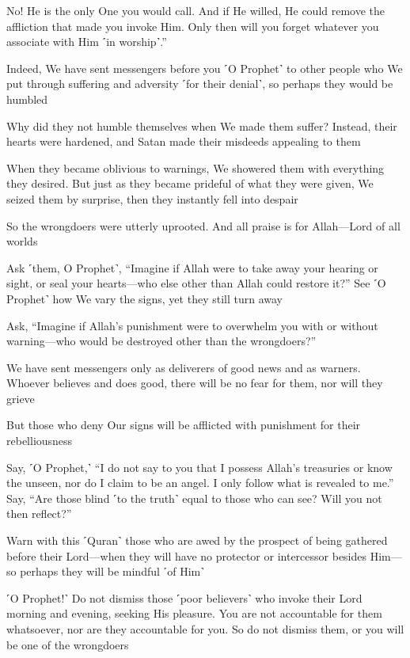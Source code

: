 No! He is the only One you would call. And if He willed, He could remove the affliction that made you invoke Him. Only then will you forget whatever you associate with Him ˹in worship˺.”

Indeed, We have sent messengers before you ˹O Prophet˺ to other people who We put through suffering and adversity ˹for their denial˺, so perhaps they would be humbled

Why did they not humble themselves when We made them suffer? Instead, their hearts were hardened, and Satan made their misdeeds appealing to them

When they became oblivious to warnings, We showered them with everything they desired. But just as they became prideful of what they were given, We seized them by surprise, then they instantly fell into despair

So the wrongdoers were utterly uprooted. And all praise is for Allah—Lord of all worlds

Ask ˹them, O Prophet˺, “Imagine if Allah were to take away your hearing or sight, or seal your hearts—who else other than Allah could restore it?” See ˹O Prophet˺ how We vary the signs, yet they still turn away

Ask, “Imagine if Allah’s punishment were to overwhelm you with or without warning—who would be destroyed other than the wrongdoers?”

We have sent messengers only as deliverers of good news and as warners. Whoever believes and does good, there will be no fear for them, nor will they grieve

But those who deny Our signs will be afflicted with punishment for their rebelliousness

Say, ˹O Prophet,˺ “I do not say to you that I possess Allah’s treasuries or know the unseen, nor do I claim to be an angel. I only follow what is revealed to me.” Say, “Are those blind ˹to the truth˺ equal to those who can see? Will you not then reflect?”

Warn with this ˹Quran˺ those who are awed by the prospect of being gathered before their Lord—when they will have no protector or intercessor besides Him—so perhaps they will be mindful ˹of Him˺

˹O Prophet!˺ Do not dismiss those ˹poor believers˺ who invoke their Lord morning and evening, seeking His pleasure. You are not accountable for them whatsoever, nor are they accountable for you. So do not dismiss them, or you will be one of the wrongdoers

